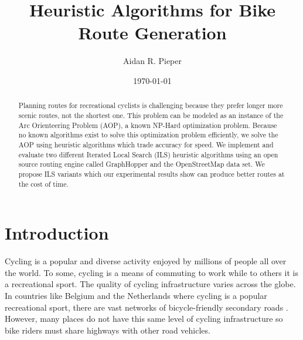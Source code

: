 \documentclass[honors]{union-cs-thesis}
\begin{document}



\title{Heuristic Algorithms for Bike Route Generation}
\author{Aidan R. Pieper}
\date{\today}


\maketitle

\begin{abstract}
\makeabstract

Planning routes for recreational cyclists is challenging because they prefer longer more scenic routes, not the shortest one. This problem can be modeled as an instance of the Arc Orienteering Problem (AOP), a known NP-Hard optimization problem. Because no known algorithms exist to solve this optimization problem efficiently, we solve the AOP using  heuristic algorithms which trade accuracy for speed. We implement and evaluate two different Iterated Local Search (ILS) heuristic algorithms using an open source routing engine called GraphHopper and the OpenStreetMap data set. We propose ILS variants which our experimental results show can produce better routes at the cost of time. 

\end{abstract}

\tableofcontents
\listoffigures %
\listoftables %
\lstlistoflistings
\makepreamble


\section{Introduction}
Cycling is a popular and diverse activity enjoyed by millions of people all over the world. To some, cycling is a means of commuting to work while to others it is a recreational sport.  The quality of cycling infrastructure varies across the globe. In countries like Belgium and the Netherlands where cycling is a popular recreational sport, there are vast networks of bicycle-friendly secondary roads \cite{souffriau2011planning}. However, many places do not have this same level of cycling infrastructure so bike riders must share highways with other road vehicles.
\end{document}
